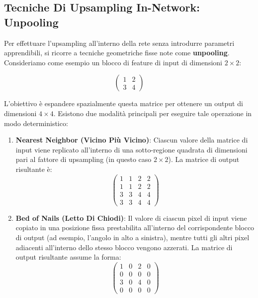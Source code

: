 ﻿\documentclass[11pt, a4paper]{article}
\begin{document}
\newpage

\subsection{Tecniche Di Upsampling In-Network: Unpooling}

Per effettuare l'upsampling all'interno della rete senza introdurre parametri apprendibili, si ricorre a tecniche geometriche fisse note come \textbf{unpooling}. Consideriamo come esempio un blocco di feature di input di dimensioni $2 \times 2$:

\[
\begin{pmatrix}
1 & 2 \\
3 & 4
\end{pmatrix}
\]

L'obiettivo è espandere spazialmente questa matrice per ottenere un output di dimensioni $4 \times 4$. Esistono due modalità principali per eseguire tale operazione in modo deterministico:


\begin{enumerate}[noitemsep]
    \item \textbf{Nearest Neighbor (Vicino Più Vicino)}: Ciascun valore della matrice di input viene replicato all'interno di una sotto-regione quadrata di dimensioni pari al fattore di upsampling (in questo caso $2 \times 2$). La matrice di output risultante è:
    \[
    \begin{pmatrix}
    1 & 1 & 2 & 2 \\
    1 & 1 & 2 & 2 \\
    3 & 3 & 4 & 4 \\
    3 & 3 & 4 & 4
    \end{pmatrix}
    \]

    \item \textbf{Bed of Nails (Letto Di Chiodi)}: Il valore di ciascun pixel di input viene copiato in una posizione fissa prestabilita all'interno del corrispondente blocco di output (ad esempio, l'angolo in alto a sinistra), mentre tutti gli altri pixel adiacenti all'interno dello stesso blocco vengono azzerati. La matrice di output risultante assume la forma:
    \[
    \begin{pmatrix}
    1 & 0 & 2 & 0 \\
    0 & 0 & 0 & 0 \\
    3 & 0 & 4 & 0 \\
    0 & 0 & 0 & 0
    \end{pmatrix}
    \]
\end{enumerate}
\end{document}
